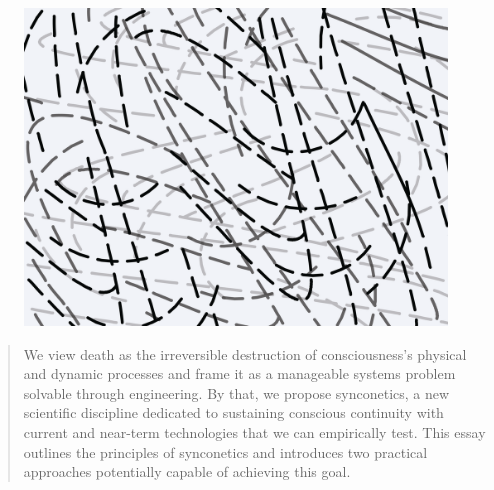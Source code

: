 \documentclass[10pt]{article}
\begin{document}
\begin{sloppypar}

  \begin{figure}[ht]
    \centering
    \includegraphics[width=\textwidth]{figures/cover.png}
    \label{fig:cover}
  \end{figure}
  \newpage



  \begin{abstract}

    We view death as the irreversible destruction of consciousness’s physical and dynamic processes and frame it as a manageable systems problem solvable through engineering. By that, we propose synconetics, a new scientific discipline dedicated to sustaining conscious continuity with current and near-term technologies that we can empirically test. This essay outlines the principles of synconetics and introduces two practical approaches potentially capable of achieving this goal.
  \end{abstract}

  \pagebreak
  \tableofcontents
  \pagebreak
  \listoffigures
  \pagebreak


\end{sloppypar}
\end{document}
